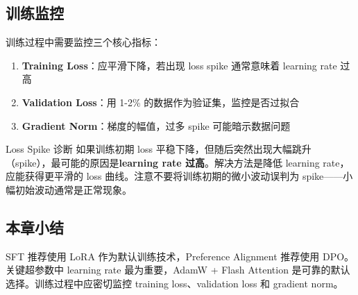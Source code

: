 \subsection{训练监控}

训练过程中需要监控三个核心指标：

\begin{enumerate}
    \item \textbf{Training Loss}：应平滑下降，若出现 loss spike 通常意味着 learning rate 过高
    \item \textbf{Validation Loss}：用 1-2\% 的数据作为验证集，监控是否过拟合
    \item \textbf{Gradient Norm}：梯度的幅值，过多 spike 可能暗示数据问题
\end{enumerate}

\begin{warningbox}{Loss Spike 诊断}
如果训练初期 loss 平稳下降，但随后突然出现大幅跳升（spike），最可能的原因是\textbf{learning rate 过高}。解决方法是降低 learning rate，应能获得更平滑的 loss 曲线。注意不要将训练初期的微小波动误判为 spike——小幅初始波动通常是正常现象。
\end{warningbox}

\subsection{本章小结}

SFT 推荐使用 LoRA 作为默认训练技术，Preference Alignment 推荐使用 DPO。关键超参数中 learning rate 最为重要，AdamW + Flash Attention 是可靠的默认选择。训练过程中应密切监控 training loss、validation loss 和 gradient norm。

\newpage
